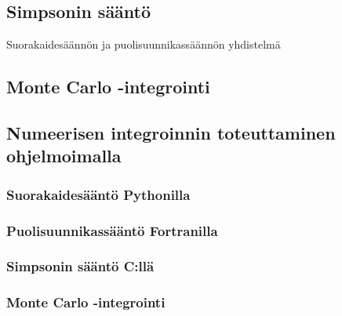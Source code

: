 \documentclass[../integrointiopas.tex]{subfiles}
\begin{document}
	\subsection{Simpsonin sääntö}
	
	Suorakaidesäännön ja puolisuunnikassäännön yhdistelmä
	
	\subsection{Monte Carlo -integrointi}
	
	\subsection{Numeerisen integroinnin toteuttaminen ohjelmoimalla}

    \subsubsection{Suorakaidesääntö Pythonilla}

    \subsubsection{Puolisuunnikassääntö Fortranilla}

    \subsubsection{Simpsonin sääntö C:llä}

    \subsubsection{Monte Carlo -integrointi }
\end{document}
